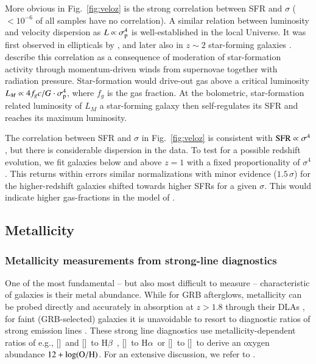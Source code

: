 \documentclass[traditabstract, longauth]{aa}
\newcommand{\hb}{H$\beta$}
\newcommand{\ha}{H$\alpha$}
\newcommand{\oh}{12+\log(\rm{O/H})}
\newcommand{\oii}{[\ion{O}{ii}]}
\newcommand{\oiii}{[\ion{O}{iii}]}
\newcommand{\nii}{[\ion{N}{ii}]}
\begin{document}
More obvious in Fig.~\ref{fig:veloz} is the strong correlation between SFR and $\sigma$ ($<10^{-6}$ of all samples have no correlation). A similar relation between luminosity and velocity dispersion as $L\propto\sigma_{\rm{p}}^{4}$ is well-established in the local Universe. It was first observed in ellipticals by \citet{1976ApJ...204..668F}, and later also in $z\sim2$ star-forming galaxies \citep{2006ApJ...646..107E}. \citet{2005ApJ...618..569M} describe this correlation as a consequence of moderation of star-formation activity through momentum-driven winds from supernovae together with radiation pressure. Star-formation would drive-out gas above a critical luminosity $L_{M} \propto 4f_{g}c/G\cdot\sigma_{\rm{p}}^{4}$, where $f_g$ is the gas fraction. At the bolometric, star-formation related luminosity of $L_M$ a star-forming galaxy then self-regulates its SFR and reaches its maximum luminosity.

The correlation between SFR and $\sigma$ in Fig.~\ref{fig:veloz} is consistent with $\rm{SFR} \propto \sigma^4$, but there is considerable dispersion in the data. To test for a possible redshift evolution, we fit galaxies below and above $z=1$ with a fixed proportionality of $\sigma^4$. This returns within errors similar normalizations with minor evidence ($1.5\,\sigma$) for the higher-redshift galaxies shifted towards higher SFRs for a given $\sigma$. This would indicate higher gas-fractions in the model of \citet{2005ApJ...618..569M}.


\subsection{Metallicity}
\label{sec:met}

\subsubsection{Metallicity measurements from strong-line diagnostics}

One of the most fundamental -- but also most difficult to measure -- characteristic of galaxies is their metal abundance. While for GRB afterglows, metallicity can be probed directly and accurately in absorption at $z>1.8$ through their DLAs \citep[e.g.,][]{2004A&A...419..927V, 2006NJPh....8..195S, 2007ApJ...666..267P, 2009A&A...506..661L}, for faint (GRB-selected) galaxies it is unavoidable to resort to diagnostic ratios of strong emission lines \citep[e.g.,][]{2006ApJ...644..813E, 2008A&A...488..463M}. These strong line diagnostics use metallicity-dependent ratios of e.g., \oii\, and \oiii\, to \hb\, \citep[e.g.,][]{1979MNRAS.189...95P, 1991ApJ...380..140M, 1994ApJ...420...87Z}, \nii\, to \ha\, \citep{1979A&A....78..200A, 2004MNRAS.348L..59P} or \nii\, to \oii\, \citep[e.g.,][]{2002ApJS..142...35K} to derive an oxygen abundance $\oh$. For an extensive discussion, we refer to \citet{2002ApJS..142...35K}.
 
\end{document}
